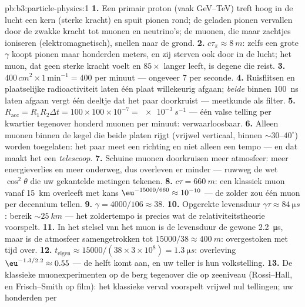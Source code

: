 \begin{solution}{pb:b3:particle-physics:1}
\textbf{1.} Een primair proton (vaak \unit{GeV}--\unit{TeV})
treft hoog in de lucht een kern (sterke kracht) en spuit pionen rond; de
geladen pionen vervallen door de zwakke kracht tot muonen en neutrino's;
de muonen, die maar zachtjes ioniseren (elektromagnetisch), snellen naar de
grond.
\textbf{2.} $c\tau_\pi \approx \qty{8}{m}$: zelfs een grote $\gamma$
koopt pionen maar honderden meters, en zij sterven ook door  in de lucht; het muon, dat geen sterke kracht voelt en
$85\times$ langer leeft, is degene die reist.
\textbf{3.} $400\,\unit{cm^2}\times1\,\text{min}^{-1} = 400$
per minuut --- ongeveer 7 per seconde.
\textbf{4.} Ruisflitsen en plaatselijke radioactiviteit laten één
plaat willekeurig afgaan; \emph{beide} binnen \qty{100}{ns} laten afgaan
vergt één deeltje dat het paar doorkruist --- meetkunde als
filter.
\textbf{5.} $R_{\text{acc}} = R_1R_2\Delta t = 100\times100
\times10^{-7} = \qty{e-3}{s^{-1}}$ --- één valse telling per
kwartier tegenover honderd muonen per minuut: verwaarloosbaar.
\textbf{6.} Alleen muonen binnen de kegel die beide platen rijgt
(vrijwel verticaal, binnen ${\sim}30$--$40^\circ$) worden
toegelaten: het paar meet een richting en niet alleen een tempo ---
en dat maakt het een \emph{telescoop}.
\textbf{7.} Schuine muonen doorkruisen meer atmosfeer: meer energieverlies
en meer  onderweg, dus overleven er minder ---
ruwweg de wet $\cos^2\theta$ die uw gekantelde metingen tekenen.
\textbf{8.} $c\tau = \qty{660}{m}$: een klassiek muon vanaf
\qty{15}{km} overleeft met kans
$\eu^{-15000/660} \approx 10^{-10}$ --- de zolder zou
één muon per decennium tellen.
\textbf{9.} $\gamma = 4000/106 \approx 38$.
\textbf{10.} Opgerekte levensduur $\gamma\tau \approx
\qty{84}{\micro s}$: bereik ${\sim}\qty{25}{km}$ --- het zoldertempo
is precies wat de relativiteitstheorie voorspelt.
\textbf{11.} In het stelsel van het muon is de levensduur de gewone
\qty{2.2}{\micro s}, maar is de atmosfeer samengetrokken tot
$15000/38 \approx \qty{400}{m}$: overgestoken met tijd over.
\textbf{12.} $t_{\text{eigen}} \approx 15000/(38\times3\times
10^8) = \qty{1.3}{\micro s}$: overleving $\eu^{-1.3/2.2} \approx
0.55$ --- de helft komt aan, en uw teller is hun volkstelling.
\textbf{13.} De klassieke muonexperimenten op de berg tegenover die op
zeeniveau (Rossi--Hall, en Frisch--Smith op film): het klassieke
verval voorspelt vrijwel nul tellingen; uw honderden per

\end{solution}
